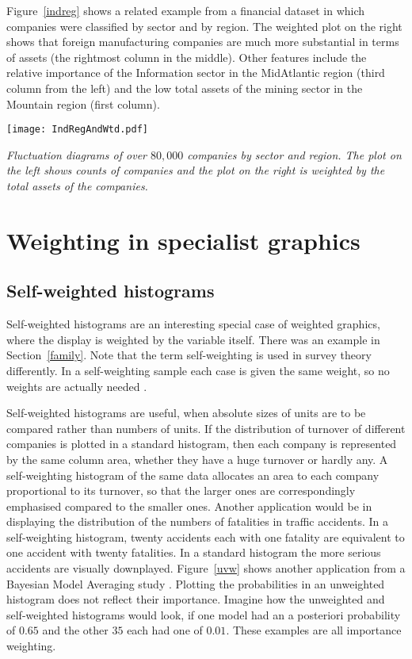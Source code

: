 \documentclass{svmult}
\begin{document}
Figure~\ref{indreg} shows a related example from a financial dataset in which companies were classified by sector and by region.  The weighted plot on the right shows that foreign manufacturing companies are much more substantial in terms of assets (the rightmost column in the middle).  Other features include the relative importance of the Information sector in the MidAtlantic region (third column from the left) and the low total assets of the mining sector in the Mountain region (first column).

\begin{center}
      \texttt{[image: IndRegAndWtd.pdf]}
      \caption{\label{indreg}\em Fluctuation diagrams of over $80,000$ companies by sector and region.  The plot on the left shows counts of companies and the plot on the right is weighted by the total assets of the companies.}
      \end{center}

\section{Weighting in specialist graphics}
\label{spec}

\subsection{Self-weighted histograms}
\label{shist}
Self-weighted histograms are an interesting special case of weighted graphics, where the display is weighted by the variable itself.  There was an example in Section~\ref{family}.  Note that the term self-weighting is used in survey theory differently.  In a self-weighting sample each case is given the same weight, so no weights are actually needed \citep{cochran:1954a}.

Self-weighted histograms are useful, when absolute sizes of units are to be compared rather than numbers of units.  If the distribution of turnover of different companies is plotted in a standard histogram, then each company is represented by the same column area, whether they have a huge turnover or hardly any.  A self-weighting histogram of the same data allocates an area to each company proportional to its turnover, so that the larger ones are correspondingly emphasised compared to the smaller ones.  Another application would be in displaying the distribution of the numbers of fatalities in traffic accidents.  In a self-weighting histogram, twenty accidents each with one fatality are equivalent to one accident with twenty fatalities.  In a standard histogram the more serious accidents are visually downplayed.  Figure~\ref{uvw} shows another application from a Bayesian Model Averaging study \citep{unwin:2003}.  Plotting the probabilities in an unweighted histogram does not reflect their importance.  Imagine how the unweighted and self-weighted histograms would look, if one model had an a posteriori probability of $0.65$ and the other $35$ each had one of $0.01$.  These examples are all importance weighting.
\end{document}
